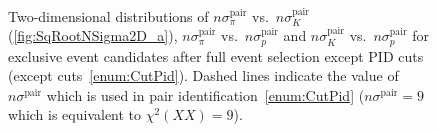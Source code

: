 \begin{figure}[h]
{  \begin{subfigure}[b]{\linewidth}\addtocounter{subfigure}{-2}\vspace*{-13pt}
  \end{subfigure}\\
  \begin{minipage}[t][1.042\linewidth][t]{\linewidth}\vspace{10pt}
    \caption[$n\sigma^{\text{pair}}_{X}$ vs. $n\sigma^{\text{pair}}_{Y}$.]{Two-dimensional distributions of $n\sigma^{\text{pair}}_{\pi}$ vs.~$n\sigma^{\text{pair}}_{K}$ (\ref{fig:SqRootNSigma2D_a}), $n\sigma^{\text{pair}}_{\pi}$ vs.~$n\sigma^{\text{pair}}_{p}$ and $n\sigma^{\text{pair}}_{K}$ vs.~$n\sigma^{\text{pair}}_{p}$ for exclusive event candidates after full event selection except PID cuts (except cuts~\ref{enum:CutPid}). Dashed lines indicate the value of $n\sigma^{\text{pair}}$ which is used in pair identification~\ref{enum:CutPid} ($n\sigma^{\text{pair}}=9$ which is equivalent to $\chi^{2}(XX)=9$).}\label{fig:SqRootNSigma2D}
  \end{minipage}
}%

\end{figure}



